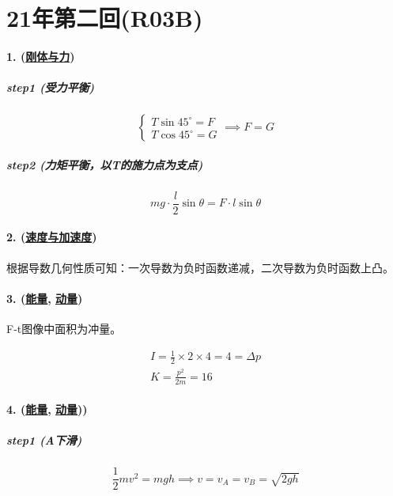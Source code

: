 
\section{21年第二回(R03B)}

\paragraph{1. (\hyperref[subsec:刚体与力]{刚体与力})}

\subparagraph{step1 (受力平衡)}

\begin{equation*}
    \begin{cases}
        T\sin45^\circ=F\\
        T\cos45^\circ=G
    \end{cases}\implies F=G
\end{equation*}

\subparagraph{step2 (力矩平衡，以T的施力点为支点)}

\begin{equation*}
    mg\cdot\frac{l}{2}\sin\theta=F\cdot l\sin\theta
\end{equation*}

\paragraph{2. (\hyperref[subsec:速度与加速度]{速度与加速度})} 根据导数几何性质可知：一次导数为负时函数递减，二次导数为负时函数上凸。
\paragraph{3. (\hyperref[subsec:能量]{能量}, \hyperref[subsec:动量]{动量})} F-t图像中面积为冲量。

\begin{gather*}
    I=\frac12\times2\times4=4=\Delta p\\
    K=\frac{p^2}{2m}=16
\end{gather*}

\paragraph{4. (\hyperref[subsec:能量]{能量}, \hyperref[subsec:动量]{动量}))}

\subparagraph{step1 (A下滑)}

\begin{equation*}
    \frac12mv^2=mgh\implies v=v_A=v_B=\sqrt{2gh}
\end{equation*}

